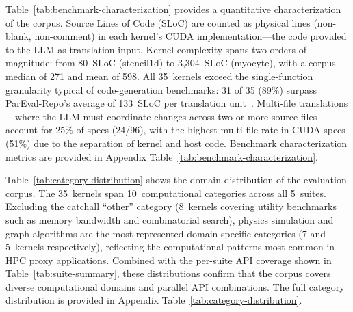 \documentclass[conference]{IEEEtran}
\begin{document}
Table~\ref{tab:benchmark-characterization} provides a quantitative characterization of the corpus. Source Lines of Code (SLoC) are counted as physical lines (non-blank, non-comment) in each kernel's CUDA implementation---the code provided to the LLM as translation input. Kernel complexity spans two orders of magnitude: from 80~SLoC (stencil1d) to 3{,}304~SLoC (myocyte), with a corpus median of 271 and mean of 598. All 35~kernels exceed the single-function granularity typical of code-generation benchmarks: 31 of 35 (89\%) surpass ParEval-Repo's average of 133~SLoC per translation unit~\cite{ParEvalRepo2025}. Multi-file translations---where the LLM must coordinate changes across two or more source files---account for 25\% of specs (24/96), with the highest multi-file rate in CUDA specs (51\%) due to the separation of kernel and host code.
Benchmark characterization metrics are provided in Appendix Table~\ref{tab:benchmark-characterization}.


Table~\ref{tab:category-distribution} shows the domain distribution of the evaluation corpus. The 35~kernels span 10~computational categories across all 5~suites. Excluding the catchall ``other'' category (8~kernels covering utility benchmarks such as memory bandwidth and combinatorial search), physics simulation and graph algorithms are the most represented domain-specific categories (7 and 5~kernels respectively), reflecting the computational patterns most common in HPC proxy applications. Combined with the per-suite API coverage shown in Table~\ref{tab:suite-summary}, these distributions confirm that the corpus covers diverse computational domains and parallel API combinations.
The full category distribution is provided in Appendix Table~\ref{tab:category-distribution}.
\end{document}
